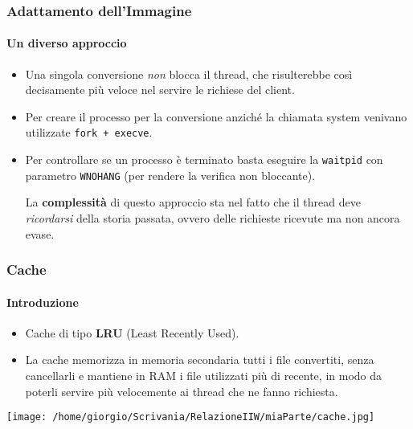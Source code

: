 \documentclass{beamer}
\begin{document}
\begin{frame}
\frametitle{Adattamento dell'Immagine}
\framesubtitle{Un diverso approccio}

\begin{itemize}
\item Una singola conversione \textit{non} blocca il thread, che risulterebbe così decisamente più
veloce nel servire le richiese del client.
\item Per creare il processo per la conversione anziché la chiamata system venivano
utilizzate \texttt{fork + execve}.
\item Per controllare se un processo è terminato basta eseguire la \texttt{waitpid} con parametro
\texttt{WNOHANG} (per rendere la verifica non bloccante).

\medskip

La \textbf{complessità} di questo approccio sta nel fatto che il thread deve \textit{ricordarsi} della storia passata, ovvero delle richieste ricevute ma non ancora evase.
\end{itemize}
\end{frame}








\begin{frame}
\frametitle{Cache}
\framesubtitle{Introduzione}

\begin{itemize}
\item Cache di tipo \textbf{LRU} (Least Recently Used).
\item La cache memorizza in memoria secondaria tutti i file
convertiti, senza cancellarli e mantiene in RAM i file utilizzati più di recente, in
modo da poterli servire più velocemente ai thread che ne fanno richiesta.
\end{itemize}



\texttt{[image: /home/giorgio/Scrivania/RelazioneIIW/miaParte/cache.jpg]}

\end{frame}
\end{document}
